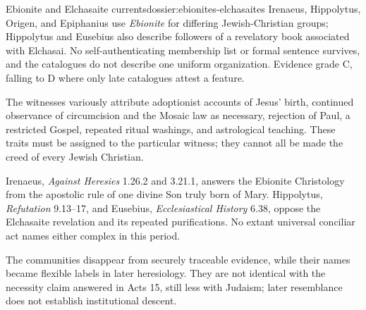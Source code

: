 \begin{heresydossier}{Ebionite and Elchasaite currents}{dossier:ebionites-elchasaites}
\objectfield Irenaeus, Hippolytus, Origen, and Epiphanius use \emph{Ebionite} for differing Jewish-Christian groups; Hippolytus and Eusebius also describe followers of a revelatory book associated with Elchasai. No self-authenticating membership list or formal sentence survives, and the catalogues do not describe one uniform organization. Evidence grade C, falling to D where only late catalogues attest a feature.

\propositionfield The witnesses variously attribute adoptionist accounts of Jesus' birth, continued observance of circumcision and the Mosaic law as necessary, rejection of Paul, a restricted Gospel, repeated ritual washings, and astrological teaching. These traits must be assigned to the particular witness; they cannot all be made the creed of every Jewish Christian.

\responsefield Irenaeus, \emph{Against Heresies} 1.26.2 and 3.21.1, answers the Ebionite Christology from the apostolic rule of one divine Son truly born of Mary. Hippolytus, \emph{Refutation} 9.13--17, and Eusebius, \emph{Ecclesiastical History} 6.38, oppose the Elchasaite revelation and its repeated purifications. No extant universal conciliar act names either complex in this period.

\aftermathfield The communities disappear from securely traceable evidence, while their names became flexible labels in later heresiology. They are not identical with the necessity claim answered in Acts 15, still less with Judaism; later resemblance does not establish institutional descent.
\end{heresydossier}

